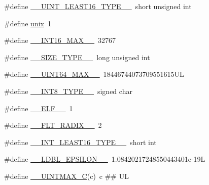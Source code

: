 \begin{DoxyCompactItemize}
\item 
\#define \hyperlink{build-analizer__host-_desktop___qt__5__9__0___g_c_c__64bit-debug_2moc__predefs_8h_a64a27148d4e67c4ae167442c7dc92a0a}{\+\_\+\+\_\+\+U\+I\+N\+T\+\_\+\+L\+E\+A\+S\+T16\+\_\+\+T\+Y\+P\+E\+\_\+\+\_\+}~short unsigned int
\item 
\#define \hyperlink{build-analizer__host-_desktop___qt__5__9__0___g_c_c__64bit-debug_2moc__predefs_8h_a4e65214f450ef6326b96b52e6dd5714b}{unix}~1
\item 
\#define \hyperlink{build-analizer__host-_desktop___qt__5__9__0___g_c_c__64bit-debug_2moc__predefs_8h_afc45bfe4241907d615bb96ed6f4fd142}{\+\_\+\+\_\+\+I\+N\+T16\+\_\+\+M\+A\+X\+\_\+\+\_\+}~32767
\item 
\#define \hyperlink{build-analizer__host-_desktop___qt__5__9__0___g_c_c__64bit-debug_2moc__predefs_8h_ab8d03bfd9e9120480015fc51dc8b8e65}{\+\_\+\+\_\+\+S\+I\+Z\+E\+\_\+\+T\+Y\+P\+E\+\_\+\+\_\+}~long unsigned int
\item 
\#define \hyperlink{build-analizer__host-_desktop___qt__5__9__0___g_c_c__64bit-debug_2moc__predefs_8h_a9f8e418d5a6f916ffe36f250fb99d7bc}{\+\_\+\+\_\+\+U\+I\+N\+T64\+\_\+\+M\+A\+X\+\_\+\+\_\+}~18446744073709551615\+U\+L
\item 
\#define \hyperlink{build-analizer__host-_desktop___qt__5__9__0___g_c_c__64bit-debug_2moc__predefs_8h_ae9a1914a564951612704f3f6630663f3}{\+\_\+\+\_\+\+I\+N\+T8\+\_\+\+T\+Y\+P\+E\+\_\+\+\_\+}~signed char
\item 
\#define \hyperlink{build-analizer__host-_desktop___qt__5__9__0___g_c_c__64bit-debug_2moc__predefs_8h_a4012402899bd689646e39a043ccb6047}{\+\_\+\+\_\+\+E\+L\+F\+\_\+\+\_\+}~1
\item 
\#define \hyperlink{build-analizer__host-_desktop___qt__5__9__0___g_c_c__64bit-debug_2moc__predefs_8h_ae9ed936cc90c092e15526478bdbbefe0}{\+\_\+\+\_\+\+F\+L\+T\+\_\+\+R\+A\+D\+I\+X\+\_\+\+\_\+}~2
\item 
\#define \hyperlink{build-analizer__host-_desktop___qt__5__9__0___g_c_c__64bit-debug_2moc__predefs_8h_a6f2032bd7e6248b526a2c13e37c7b972}{\+\_\+\+\_\+\+I\+N\+T\+\_\+\+L\+E\+A\+S\+T16\+\_\+\+T\+Y\+P\+E\+\_\+\+\_\+}~short int
\item 
\#define \hyperlink{build-analizer__host-_desktop___qt__5__9__0___g_c_c__64bit-debug_2moc__predefs_8h_ad7a5615aea1516ee885112456cf695e8}{\+\_\+\+\_\+\+L\+D\+B\+L\+\_\+\+E\+P\+S\+I\+L\+O\+N\+\_\+\+\_\+}~1.\+08420217248550443401e-\/19\+L
\item 
\#define \hyperlink{build-analizer__host-_desktop___qt__5__9__0___g_c_c__64bit-debug_2moc__predefs_8h_aee4eb3a89493f1c9251a5a52f700f21d}{\+\_\+\+\_\+\+U\+I\+N\+T\+M\+A\+X\+\_\+\+C}(c)~c \#\# U\+L

\end{DoxyCompactItemize}
